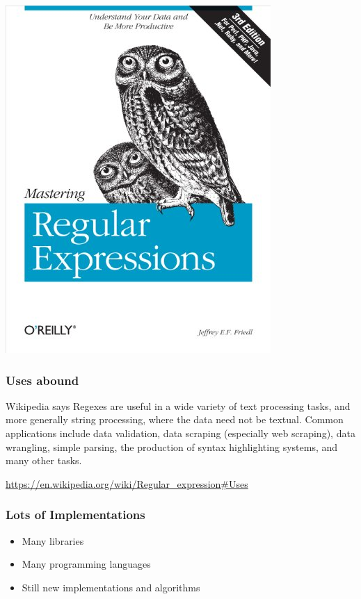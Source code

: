 \documentclass[pdftex,aspectratio=169]{beamer}
\begin{document}
\begin{frame}
\begin{center}
    \includegraphics[scale=0.25]{book-mastering-regular-expressions}
  \end{center}
\end{frame}

\begin{frame}
  \frametitle{Uses abound}
  \begin{block}{Wikipedia says}
    Regexes are useful in a wide variety of text processing tasks, and
    more generally string processing, where the data need not be
    textual. Common applications include data validation, data
    scraping (especially web scraping), data wrangling, simple
    parsing, the production of syntax highlighting systems, and many
    other tasks.

    \url{https://en.wikipedia.org/wiki/Regular_expression\#Uses}
  \end{block}
\end{frame}

\begin{frame}
  \frametitle{Lots of Implementations}
  \begin{itemize}
  \item Many libraries
  \item Many programming languages
  \item Still new implementations and algorithms
  \end{itemize}
\end{frame}
\end{document}
